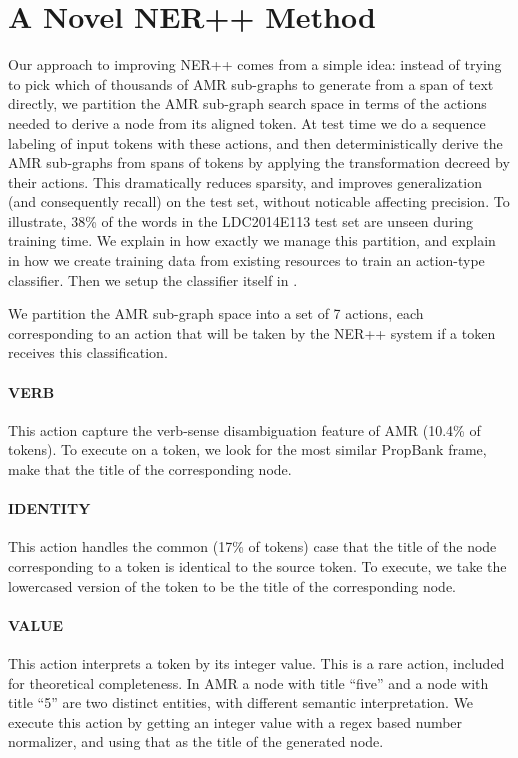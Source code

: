 \documentclass[11pt]{article}
\begin{document}
\section{A Novel NER++ Method}\label{sec:nerplusplus}
Our approach to improving NER++ comes from a simple idea: instead of trying to pick 
  which of thousands of AMR sub-graphs to generate from a span of text directly, 
  we partition the AMR sub-graph search space in terms of the actions needed to 
  derive a node from its aligned token. 
At test time we do a sequence labeling of input tokens with these actions, and 
  then deterministically derive the AMR sub-graphs from spans of tokens by applying 
  the transformation decreed by their actions. 
This dramatically reduces sparsity, and improves generalization (and consequently
  recall) on the test set, without noticable affecting precision.
To illustrate, 38\% of the words in the LDC2014E113 test set are 
  unseen during training time.
We explain in  how exactly we manage this partition, and explain in  how we create training data from existing resources to train an action-type classifier. Then we setup the classifier itself in .


We partition the AMR sub-graph space into a set of 7 actions, each corresponding to an action that will be taken by the NER++ system if a token receives this classification.

\paragraph{VERB} This action capture the verb-sense disambiguation feature of AMR (10.4\% of tokens). To execute on a token, we look for the most similar PropBank frame, make that the title of the corresponding node.
\paragraph{IDENTITY} This action handles the common (17\% of tokens) case that the title of the node corresponding to a token is identical to the source token. To execute, we take the lowercased version of the token to be the title of the corresponding node.
\paragraph{VALUE} This action interprets a token by its integer value. This is a rare action, included for theoretical completeness. In AMR a node with title ``five'' and a node with title ``5'' are two distinct entities, with different semantic interpretation. We execute this action by getting an integer value with a regex based number normalizer, and using that as the title of the generated node.
\end{document}

